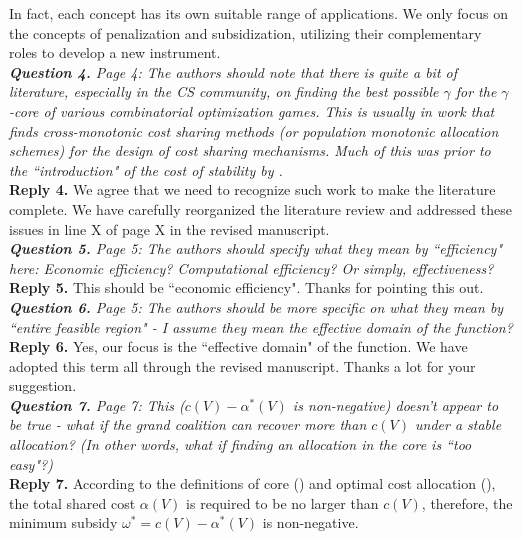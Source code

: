 \documentclass[11pt]{article}
\begin{document}
In fact, each concept has its own suitable range of applications.
We only focus on the concepts of penalization and subsidization,
utilizing their complementary roles to develop a new instrument.
\\[4mm]
%
%
%
\noindent \textit{\textbf{Question 4.}
Page 4: The authors should note that there is quite a bit of literature, especially in the CS community, on finding the best possible $\gamma$ for the $\gamma$-core of various combinatorial optimization games. This is usually in work that finds cross-monotonic cost sharing methods (or population monotonic allocation schemes) for the design of cost sharing mechanisms. Much of this was prior to the ``introduction" of the cost of stability by \cite{bachrach2009cost}.
}
\\[2mm]
\noindent \textbf{Reply 4.}
We agree that we need to recognize such work to make the literature complete.
We have carefully reorganized the literature review and addressed these issues in line X of page X in the revised manuscript.
\\[4mm]
%
%
%
\noindent \textit{\textbf{Question 5.}
Page 5: The authors should specify what they mean by ``efficiency" here: Economic efficiency? Computational efficiency? Or simply, effectiveness?
}
\\[2mm]
\noindent \textbf{Reply 5.}
This should be ``economic efficiency". Thanks for pointing this out.
\\[4mm]
%
%
%
\noindent \textit{\textbf{Question 6.}
Page 5: The authors should be more specific on what they mean by ``entire feasible region" - I assume they mean the effective domain of the function?
}
\\[2mm]
\noindent \textbf{Reply 6.}
Yes, our focus is the ``effective domain" of the function.
We have adopted this term all through the revised manuscript.
Thanks a lot for your suggestion.
\\[4mm]
%
%
%
\noindent \textit{\textbf{Question 7.}
Page 7: This ($c(V)-\alpha^*(V)$ is non-negative) doesn't appear to be true - what if the grand coalition can recover more than $c(V)$ under a stable allocation? (In other words, what if finding an allocation in the core is ``too easy"?)
}
\\[2mm]
\noindent \textbf{Reply 7.}
According to the definitions of core (\citealt{Jain2007CostSharing}) and optimal cost allocation (\citealt{Caprara2010LPB}), the total shared cost $\alpha(V)$ is required to be no larger than $c(V)$, therefore, the minimum subsidy $\omega^* = c(V) - \alpha^*(V)$ is non-negative.
\end{document}
